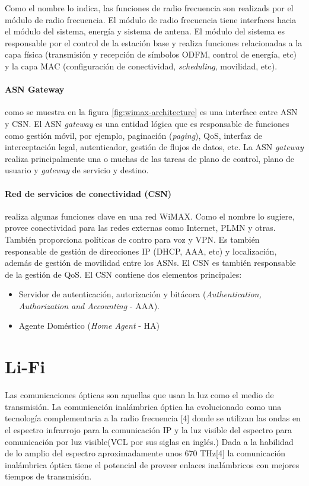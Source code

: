 \documentclass[10pt,journal,compsoc]{IEEEtran}
\begin{document}
Como el nombre lo indica, las funciones de radio frecuencia son realizads por el módulo de radio frecuencia. El módulo de radio frecuencia tiene interfaces hacia el módulo del sistema, energía y sistema de antena. El módulo del sistema es responsable por el control de la estación base y realiza funciones relacionadas a la capa física (transmisión y recepción de símbolos ODFM, control de energía, etc) y la capa MAC (configuración de conectividad, \emph{scheduling}, movilidad, etc).

\paragraph{ASN Gateway} como se muestra en la figura \ref{fig:wimax-architecture} es una interface entre ASN y CSN. El ASN \emph{gateway} es una entidad lógica que es responsable de funciones como gestión móvil, por ejemplo, paginación (\emph{paging}), QoS, interfaz de interceptación legal, autenticador, gestión de flujos de datos, etc. La ASN \emph{gateway} realiza principalmente una o muchas de las tareas de plano de control, plano de usuario y \emph{gateway} de servicio y destino.

\paragraph{Red de servicios de conectividad (CSN)} realiza algunas funciones clave en una red WiMAX. Como el nombre lo sugiere, provee conectividad para las redes externas como Internet, PLMN y otras. También proporciona políticas de contro para voz y VPN. Es también responsable de gestión de direcciones IP (DHCP, AAA, etc) y localización, además de gestión de movilidad entre los ASNs. El CSN es también responsable de la gestión de QoS. El CSN contiene dos elementos principales:
\begin{itemize}
    \item Servidor de autenticación, autorización y bitácora (\emph{Authentication, Authorization and Accounting} - AAA).
    \item Agente Doméstico (\emph{Home Agent} - HA)
\end{itemize}

\section{Li-Fi}

Las comunicaciones ópticas son aquellas que usan la luz como el medio de transmisión. La comunicación inalámbrica óptica ha evolucionado como una tecnología complementaria a la radio frecuencia [4] donde se utilizan las ondas en el espectro infrarrojo para la comunicación IP y la luz visible del espectro para comunicación por luz visible(VCL por sus siglas en inglés.) Dada a la habilidad de lo amplio del espectro aproximadamente unos 670 THz[4] la comunicación inalámbrica óptica tiene el potencial de proveer enlaces inalámbricos con mejores tiempos de transmisión. 
\end{document}
